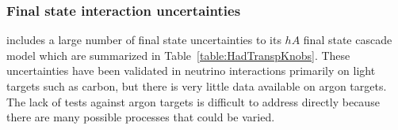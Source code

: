 \subsubsection{Final state interaction uncertainties}\label{sec:fsi}
 includes a large number of final state uncertainties to its $hA$ final state cascade model which are summarized in Table~\ref{table:HadTranspKnobs}.  These uncertainties have been validated in neutrino interactions primarily on light targets such as carbon, but there is very little data available on argon targets.
The lack of tests against argon targets is difficult to address directly because there are many possible  processes that could be varied.%




